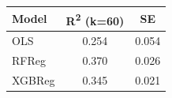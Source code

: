 \centering
\small
\begin{tabular}{lcc}
\hline
Model & R\textsuperscript{2} (k=60) & SE \\
\hline
OLS & 0.254 & 0.054 \\
RFReg & 0.370 & 0.026 \\
XGBReg & 0.345 & 0.021 \\
\hline
\end{tabular}
